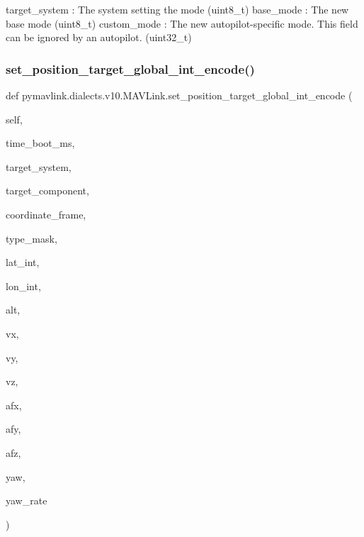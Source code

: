 \begin{DoxyVerb}
\begin{DoxyVerb}
\begin{DoxyVerb}
\begin{DoxyVerb}
\begin{DoxyVerb}
\begin{DoxyVerb}
\begin{DoxyVerb}
\begin{DoxyVerb}
\begin{DoxyVerb}
\begin{DoxyVerb}
\begin{DoxyVerb}
target_system             : The system setting the mode (uint8_t)
base_mode                 : The new base mode (uint8_t)
custom_mode               : The new autopilot-specific mode. This field can be ignored by an autopilot. (uint32_t)\end{DoxyVerb}
 \mbox{\label{classpymavlink_1_1dialects_1_1v10_1_1MAVLink_ad123ba8e1950564101d409079d4a86eb}} 
\subsubsection{\texorpdfstring{set\+\_\+position\+\_\+target\+\_\+global\+\_\+int\+\_\+encode()}{set\_position\_target\_global\_int\_encode()}}
{\footnotesize\ttfamily def pymavlink.\+dialects.\+v10.\+M\+A\+V\+Link.\+set\+\_\+position\+\_\+target\+\_\+global\+\_\+int\+\_\+encode (\begin{DoxyParamCaption}\item[{}]{self,  }\item[{}]{time\+\_\+boot\+\_\+ms,  }\item[{}]{target\+\_\+system,  }\item[{}]{target\+\_\+component,  }\item[{}]{coordinate\+\_\+frame,  }\item[{}]{type\+\_\+mask,  }\item[{}]{lat\+\_\+int,  }\item[{}]{lon\+\_\+int,  }\item[{}]{alt,  }\item[{}]{vx,  }\item[{}]{vy,  }\item[{}]{vz,  }\item[{}]{afx,  }\item[{}]{afy,  }\item[{}]{afz,  }\item[{}]{yaw,  }\item[{}]{yaw\+\_\+rate }\end{DoxyParamCaption})}


\end{DoxyVerb}
\end{DoxyVerb}
\end{DoxyVerb}
\end{DoxyVerb}
\end{DoxyVerb}
\end{DoxyVerb}
\end{DoxyVerb}
\end{DoxyVerb}
\end{DoxyVerb}
\end{DoxyVerb}
